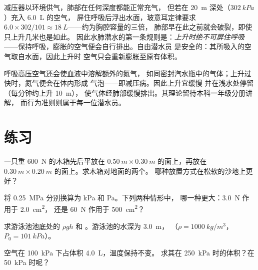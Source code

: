\begin{remark}[切勿屏住呼吸]\label{rem:g10:pressure:breath}
减压器以环境供气，肺部在任何深度都能正常充气，
但若在 \qty{20}{m} 深处（$\qty{302}{kPa}$）充入 \qty{6.0}{L} 的空气，
屏住呼吸后浮出水面，玻意耳定律要求
$6.0 \times 302/101 \approx \qty{18}{L}$——约为胸腔容量的三倍，
肺部早在此之前就会破裂，即使只上升几米也是如此。
因此水肺潜水的第一条规则是：\emph{上升时绝不可屏住呼吸}
——保持呼吸，膨胀的空气便会自行排出。自由潜水员
是安全的：其所吸入的空气取自水面，因此上升时
空气只会重新膨胀至原有体积。
\end{remark}

\begin{remark}[减压病]\label{rem:g10:pressure:deco}
呼吸高压空气还会使血液中溶解额外的氮气，
如同密封汽水瓶中的气体；上升过快时，氮气便会在体内形成
气泡——即减压病。因此上升宜缓慢
并在浅水处停留（每分钟约上升 \qty{10}{m}），
使气体经肺部缓慢排出。其理论留待本科一年级分册讲解，
而行为准则则属于每一位潜水员。
\end{remark}

\section{练习}

\begin{exercise}[$\star$]\label{exo:g10:pressure:1}
一只重 \qty{600}{N} 的木箱先后平放在
$\qty{0.50}{m} \times \qty{0.30}{m}$ 的面上，再放在
$\qty{0.30}{m} \times \qty{0.20}{m}$ 的面上。求木箱对地面的两个。
哪种放置方式在松软的沙地上更好？
\end{exercise}

\begin{exercise}[$\star$]\label{exo:g10:pressure:2}
将 \qty{0.25}{MPa} 分别换算为 \unit{kPa} 和 \unit{Pa}。下列两种情形中，
哪一种更大：\qty{3.0}{N} 作用于 \qty{2.0}{cm^2}，
还是 \qty{60}{N} 作用于 \qty{500}{cm^2}？
\end{exercise}

\begin{exercise}[$\star$]\label{exo:g10:pressure:3}
求游泳池池底处的 $\rho g h$ 和
。游泳池的水深为 \qty{3.0}{m}，
（$\rho = \qty{1000}{kg/m^3}$，$P_0 = \qty{101}{kPa}$）。
\end{exercise}

\begin{exercise}[$\star$]\label{exo:g10:pressure:4}
空气在 \qty{100}{kPa} 下占体积 \qty{4.0}{L}，温度保持不变。
求其在 \qty{250}{kPa} 时的体积？在 \qty{50}{kPa} 时呢？
\end{exercise}

